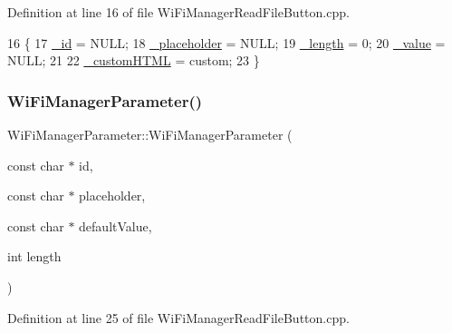 Definition at line 16 of file Wi\+Fi\+Manager\+Read\+File\+Button.\+cpp.


\begin{DoxyCode}
16                                                              \{
17   \hyperlink{class_wi_fi_manager_parameter_a2b468d83df6e0714c18a38f09e7996ed}{\_id} = NULL;
18   \hyperlink{class_wi_fi_manager_parameter_aceb6003c96280319fb19f83ebaf3034b}{\_placeholder} = NULL;
19   \hyperlink{class_wi_fi_manager_parameter_a30ca2df3654651a1b5320261a061b774}{\_length} = 0;
20   \hyperlink{class_wi_fi_manager_parameter_a80c6492e74603e4df46219b23580ecb6}{\_value} = NULL;
21 
22   \hyperlink{class_wi_fi_manager_parameter_a3823cb117da1a75860cc3e81b0c6f80d}{\_customHTML} = custom;
23 \}
\end{DoxyCode}
\mbox{\label{class_wi_fi_manager_parameter_a8e55ac907530d04ab60d30045e1382a1}} 
\subsubsection{\texorpdfstring{Wi\+Fi\+Manager\+Parameter()}{WiFiManagerParameter()}\hspace{0.1cm}{\footnotesize\ttfamily [2/3]}}
{\footnotesize\ttfamily Wi\+Fi\+Manager\+Parameter\+::\+Wi\+Fi\+Manager\+Parameter (\begin{DoxyParamCaption}\item[{const char $\ast$}]{id,  }\item[{const char $\ast$}]{placeholder,  }\item[{const char $\ast$}]{default\+Value,  }\item[{int}]{length }\end{DoxyParamCaption})}



Definition at line 25 of file Wi\+Fi\+Manager\+Read\+File\+Button.\+cpp.


